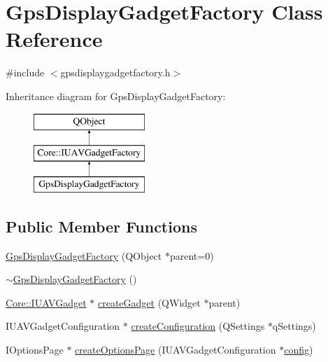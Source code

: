 \hypertarget{class_gps_display_gadget_factory}{\section{Gps\-Display\-Gadget\-Factory Class Reference}
\label{class_gps_display_gadget_factory}
}


{\ttfamily \#include $<$gpsdisplaygadgetfactory.\-h$>$}

Inheritance diagram for Gps\-Display\-Gadget\-Factory\-:\begin{figure}[H]
\begin{center}
\leavevmode
\includegraphics[height=3.000000cm]{class_gps_display_gadget_factory}
\end{center}
\end{figure}
\subsection*{Public Member Functions}
\begin{DoxyCompactItemize}
\item 
\hyperlink{group___g_p_s_gadget_plugin_ga5c7c8cda8cf65d39d9ae165194901eee}{Gps\-Display\-Gadget\-Factory} (Q\-Object $\ast$parent=0)
\item 
\hyperlink{group___g_p_s_gadget_plugin_ga82537537ded6a09ef83bb5b8480dc521}{$\sim$\-Gps\-Display\-Gadget\-Factory} ()
\item 
\hyperlink{class_core_1_1_i_u_a_v_gadget}{Core\-::\-I\-U\-A\-V\-Gadget} $\ast$ \hyperlink{group___g_p_s_gadget_plugin_gabda9dce6df1e2608e4450ae1573588df}{create\-Gadget} (Q\-Widget $\ast$parent)
\item 
I\-U\-A\-V\-Gadget\-Configuration $\ast$ \hyperlink{group___g_p_s_gadget_plugin_gae66522a3ebff0d0efac6e71ddf729657}{create\-Configuration} (Q\-Settings $\ast$q\-Settings)
\item 
I\-Options\-Page $\ast$ \hyperlink{group___g_p_s_gadget_plugin_gab72aeb74597d8373b64dce43943c9e75}{create\-Options\-Page} (I\-U\-A\-V\-Gadget\-Configuration $\ast$\hyperlink{deflate_8c_a4473b5227787415097004fd39f55185e}{config})
\end{DoxyCompactItemize}
